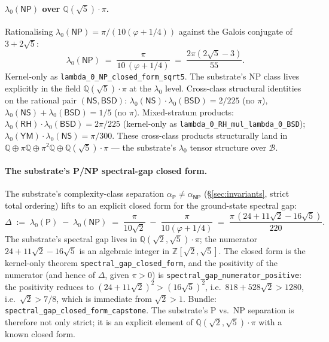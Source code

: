 \documentclass[11pt,a4paper]{amsart}
\theoremstyle{plain}
\theoremstyle{definition}
\begin{document}
\paragraph{$\lambda_0(\textsf{NP})$ over $\mathbb{Q}(\sqrt{5})\cdot\pi$.} Rationalising $\lambda_0(\textsf{NP}) = \pi/(10(\varphi+1/4))$ against the Galois conjugate of $3 + 2\sqrt{5}$:
\[
\lambda_0(\textsf{NP}) \;=\; \frac{\pi}{10\,(\varphi + 1/4)} \;=\; \frac{2\pi(2\sqrt{5} - 3)}{55}.
\]
Kernel-only as \texttt{lambda\_0\_NP\_closed\_form\_sqrt5}. The substrate's NP class lives explicitly in the field $\mathbb{Q}(\sqrt{5})\cdot\pi$ at the $\lambda_0$ level. Cross-class structural identities on the rational pair $(\textsf{NS}, \textsf{BSD})$: $\lambda_0(\textsf{NS})\cdot\lambda_0(\textsf{BSD}) = 2/225$ (no $\pi$), $\lambda_0(\textsf{NS}) + \lambda_0(\textsf{BSD}) = 1/5$ (no $\pi$). Mixed-stratum products: $\lambda_0(\textsf{RH})\cdot\lambda_0(\textsf{BSD}) = 2\pi/225$ (kernel-only as \texttt{lambda\_0\_RH\_mul\_lambda\_0\_BSD}); $\lambda_0(\textsf{YM})\cdot\lambda_0(\textsf{NS}) = \pi/300$. These cross-class products structurally land in $\mathbb{Q}\oplus\pi\mathbb{Q}\oplus\pi^2\mathbb{Q}\oplus\mathbb{Q}(\sqrt{5})\cdot\pi$ --- the substrate's $\lambda_0$ tensor structure over $\mathcal{B}$.

\paragraph{The substrate's P/NP spectral-gap closed form.} The substrate's complexity-class separation $\alpha_{\textsf{P}} \neq \alpha_{\textsf{NP}}$ (\S\ref{sec:invariants}, strict total ordering) lifts to an explicit closed form for the ground-state spectral gap:
\[
\Delta \;:=\; \lambda_0(\textsf{P}) \;-\; \lambda_0(\textsf{NP}) \;=\; \frac{\pi}{10\sqrt{2}} \;-\; \frac{\pi}{10(\varphi + 1/4)} \;=\; \frac{\pi\,(24 + 11\sqrt{2} - 16\sqrt{5})}{220}.
\]
The substrate's spectral gap lives in $\mathbb{Q}(\sqrt{2},\sqrt{5})\cdot\pi$; the numerator $24 + 11\sqrt{2} - 16\sqrt{5}$ is an algebraic integer in $\mathbb{Z}[\sqrt{2}, \sqrt{5}]$. The closed form is the kernel-only theorem \texttt{spectral\_gap\_closed\_form}, and the positivity of the numerator (and hence of $\Delta$, given $\pi > 0$) is \texttt{spectral\_gap\_numerator\_positive}: the positivity reduces to $(24 + 11\sqrt{2})^2 > (16\sqrt{5})^2$, i.e.\ $818 + 528\sqrt{2} > 1280$, i.e.\ $\sqrt{2} > 7/8$, which is immediate from $\sqrt{2} > 1$. Bundle: \texttt{spectral\_gap\_closed\_form\_capstone}. The substrate's P vs.\ NP separation is therefore not only strict; it is an explicit element of $\mathbb{Q}(\sqrt{2}, \sqrt{5})\cdot\pi$ with a known closed form.
\end{document}
